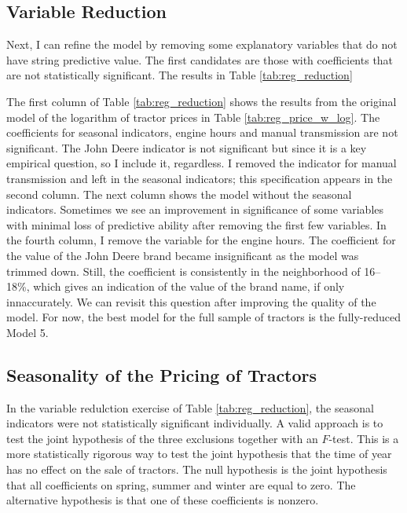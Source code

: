 \documentclass[11pt]{paper}
\begin{document}
\subsection{Variable Reduction}

Next, I can refine the model by removing some explanatory variables that do not have string predictive value.
The first candidates are those with coefficients that are not statistically significant. 
The results in Table \ref{tab:reg_reduction}



The first column of Table \ref{tab:reg_reduction}
shows the results from the original model of
the logarithm of tractor prices in Table \ref{tab:reg_price_w_log}. 
The coefficients for seasonal indicators, 
engine hours and manual transmission are not significant.
The John Deere indicator is not significant
but since it is a key empirical question, 
so I include it, regardless. 
I removed the indicator for manual transmission
and left in the seasonal indicators;
this specification appears in the second column. 
The next column shows the model without the seasonal indicators. 
Sometimes we see an improvement in significance of
some variables with minimal loss of predictive ability
after removing the first few variables. 
In the fourth column, I remove the variable for the engine hours. 
The coefficient for the value of the John Deere brand
became insignificant as the model was trimmed down. 
Still, the coefficient is consistently in the neighborhood of 16--18\%, 
which gives an indication of the value of the brand name, if only innaccurately. 
We can revisit this question after improving the quality of the model. 
For now, the best model for the full sample of tractors
is the fully-reduced Model 5.

\clearpage
\subsection{Seasonality of the Pricing of Tractors}

In the variable redulction exercise 
of Table \ref{tab:reg_reduction},
the seasonal indicators were not statistically significant individually.
A valid approach is to test the joint hypothesis 
of the three exclusions together with an $F$-test.
This is a more statistically rigorous way
to test the joint hypothesis that the time of year has no effect on the sale of tractors. 
%
The null hypothesis is the joint hypothesis that all coefficients on spring, summer and winter are equal to zero. 
The alternative hypothesis is that one of these coefficients is nonzero. 
% 
\end{document}
